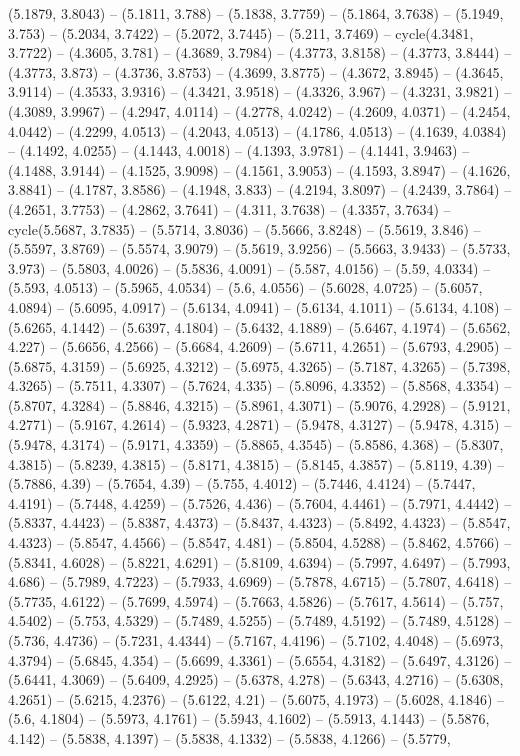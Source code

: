 (5.1879, 3.8043) -- (5.1811, 3.788) -- (5.1838, 3.7759) -- (5.1864, 3.7638) -- (5.1949, 3.753) -- (5.2034, 3.7422) -- (5.2072, 3.7445) -- (5.211, 3.7469) -- cycle(4.3481, 3.7722) -- (4.3605, 3.781) -- (4.3689, 3.7984) -- (4.3773, 3.8158) -- (4.3773, 3.8444) -- (4.3773, 3.873) -- (4.3736, 3.8753) -- (4.3699, 3.8775) -- (4.3672, 3.8945) -- (4.3645, 3.9114) -- (4.3533, 3.9316) -- (4.3421, 3.9518) -- (4.3326, 3.967) -- (4.3231, 3.9821) -- (4.3089, 3.9967) -- (4.2947, 4.0114) -- (4.2778, 4.0242) -- (4.2609, 4.0371) -- (4.2454, 4.0442) -- (4.2299, 4.0513) -- (4.2043, 4.0513) -- (4.1786, 4.0513) -- (4.1639, 4.0384) -- (4.1492, 4.0255) -- (4.1443, 4.0018) -- (4.1393, 3.9781) -- (4.1441, 3.9463) -- (4.1488, 3.9144) -- (4.1525, 3.9098) -- (4.1561, 3.9053) -- (4.1593, 3.8947) -- (4.1626, 3.8841) -- (4.1787, 3.8586) -- (4.1948, 3.833) -- (4.2194, 3.8097) -- (4.2439, 3.7864) -- (4.2651, 3.7753) -- (4.2862, 3.7641) -- (4.311, 3.7638) -- (4.3357, 3.7634) -- cycle(5.5687, 3.7835) -- (5.5714, 3.8036) -- (5.5666, 3.8248) -- (5.5619, 3.846) -- (5.5597, 3.8769) -- (5.5574, 3.9079) -- (5.5619, 3.9256) -- (5.5663, 3.9433) -- (5.5733, 3.973) -- (5.5803, 4.0026) -- (5.5836, 4.0091) -- (5.587, 4.0156) -- (5.59, 4.0334) -- (5.593, 4.0513) -- (5.5965, 4.0534) -- (5.6, 4.0556) -- (5.6028, 4.0725) -- (5.6057, 4.0894) -- (5.6095, 4.0917) -- (5.6134, 4.0941) -- (5.6134, 4.1011) -- (5.6134, 4.108) -- (5.6265, 4.1442) -- (5.6397, 4.1804) -- (5.6432, 4.1889) -- (5.6467, 4.1974) -- (5.6562, 4.227) -- (5.6656, 4.2566) -- (5.6684, 4.2609) -- (5.6711, 4.2651) -- (5.6793, 4.2905) -- (5.6875, 4.3159) -- (5.6925, 4.3212) -- (5.6975, 4.3265) -- (5.7187, 4.3265) -- (5.7398, 4.3265) -- (5.7511, 4.3307) -- (5.7624, 4.335) -- (5.8096, 4.3352) -- (5.8568, 4.3354) -- (5.8707, 4.3284) -- (5.8846, 4.3215) -- (5.8961, 4.3071) -- (5.9076, 4.2928) -- (5.9121, 4.2771) -- (5.9167, 4.2614) -- (5.9323, 4.2871) -- (5.9478, 4.3127) -- (5.9478, 4.315) -- (5.9478, 4.3174) -- (5.9171, 4.3359) -- (5.8865, 4.3545) -- (5.8586, 4.368) -- (5.8307, 4.3815) -- (5.8239, 4.3815) -- (5.8171, 4.3815) -- (5.8145, 4.3857) -- (5.8119, 4.39) -- (5.7886, 4.39) -- (5.7654, 4.39) -- (5.755, 4.4012) -- (5.7446, 4.4124) -- (5.7447, 4.4191) -- (5.7448, 4.4259) -- (5.7526, 4.436) -- (5.7604, 4.4461) -- (5.7971, 4.4442) -- (5.8337, 4.4423) -- (5.8387, 4.4373) -- (5.8437, 4.4323) -- (5.8492, 4.4323) -- (5.8547, 4.4323) -- (5.8547, 4.4566) -- (5.8547, 4.481) -- (5.8504, 4.5288) -- (5.8462, 4.5766) -- (5.8341, 4.6028) -- (5.8221, 4.6291) -- (5.8109, 4.6394) -- (5.7997, 4.6497) -- (5.7993, 4.686) -- (5.7989, 4.7223) -- (5.7933, 4.6969) -- (5.7878, 4.6715) -- (5.7807, 4.6418) -- (5.7735, 4.6122) -- (5.7699, 4.5974) -- (5.7663, 4.5826) -- (5.7617, 4.5614) -- (5.757, 4.5402) -- (5.753, 4.5329) -- (5.7489, 4.5255) -- (5.7489, 4.5192) -- (5.7489, 4.5128) -- (5.736, 4.4736) -- (5.7231, 4.4344) -- (5.7167, 4.4196) -- (5.7102, 4.4048) -- (5.6973, 4.3794) -- (5.6845, 4.354) -- (5.6699, 4.3361) -- (5.6554, 4.3182) -- (5.6497, 4.3126) -- (5.6441, 4.3069) -- (5.6409, 4.2925) -- (5.6378, 4.278) -- (5.6343, 4.2716) -- (5.6308, 4.2651) -- (5.6215, 4.2376) -- (5.6122, 4.21) -- (5.6075, 4.1973) -- (5.6028, 4.1846) -- (5.6, 4.1804) -- (5.5973, 4.1761) -- (5.5943, 4.1602) -- (5.5913, 4.1443) -- (5.5876, 4.142) -- (5.5838, 4.1397) -- (5.5838, 4.1332) -- (5.5838, 4.1266) -- (5.5779, 